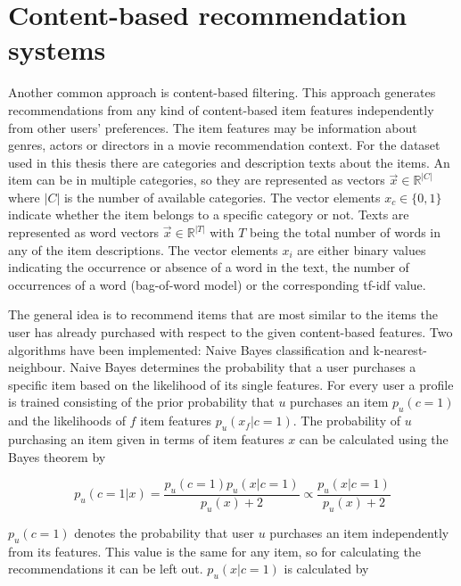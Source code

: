 \documentclass[10pt]{reportMaster}
\begin{document}
\section{Content-based recommendation systems} %
\label{rs_cb}
Another common approach is content-based filtering.
This approach generates recommendations from any kind of content-based item features independently from other users' preferences.
The item features may be information about genres, actors or directors in a movie recommendation context.
For the dataset used in this thesis there are categories and description texts about the items.
An item can be in multiple categories, so they are represented as vectors $\vec{x} \in \mathds{R}^{|C|}$ where $|C|$ is the number of available categories.
The vector elements $x_c \in \{0,1\}$ indicate whether the item belongs to a specific category or not. 
Texts are represented as word vectors $\vec{x} \in \mathds{R}^{|T|}$ with $T$ being the total number of words in any of the item descriptions.
The vector elements $x_i$ are either binary values indicating the occurrence or absence of a word in the text, the number of occurrences of a word (bag-of-word model) or the corresponding tf-idf value. %

The general idea is to recommend items that are most similar to the items the user has already purchased with respect to the given content-based features.
Two algorithms have been implemented: Naive Bayes classification and k-nearest-neighbour. %
Naive Bayes determines the probability that a user purchases a specific item based on the likelihood of its single features.
For every user a profile is trained consisting of the prior probability that $u$ purchases an item $p_u(c=1)$ and  the likelihoods of $f$ item features $p_u(x_f|c=1)$.
The probability of $u$ purchasing an item given in terms of item features $x$ can be calculated using the Bayes theorem by 

\begin{equation}
\label{BayesPost}
	p_u(c=1|x) = \frac{p_u(c=1) p_u(x|c=1)}{p_u(x)+2} \propto \frac{p_u(x|c=1)}{p_u(x)+2}
\end{equation}

$p_u(c=1)$ denotes the probability that user $u$ purchases an item independently from its features.
This value is the same for any item, so for calculating the recommendations it can be left out.
$p_u(x|c=1)$ is calculated by 
\end{document}
